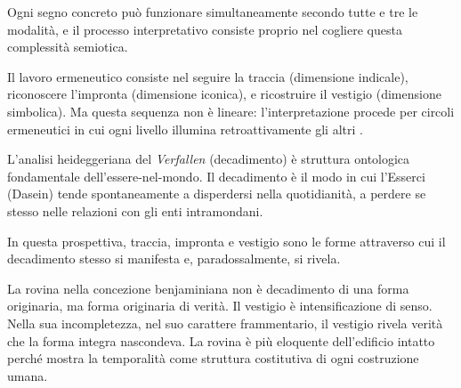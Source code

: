 \documentclass{../../lib/gs}
\begin{document}

Ogni segno concreto può funzionare simultaneamente secondo tutte e tre le modalità, e il processo interpretativo consiste proprio nel cogliere questa complessità semiotica.

Il lavoro ermeneutico consiste nel seguire la traccia (dimensione indicale), riconoscere l'impronta (dimensione iconica), e ricostruire il vestigio (dimensione simbolica). Ma questa sequenza non è lineare: l'interpretazione procede per circoli ermeneutici in cui ogni livello illumina retroattivamente gli altri \cite{gadamer1960}.

%

L'analisi heideggeriana del \textit{Verfallen} (decadimento) \cite{heidegger1927} è struttura ontologica fondamentale dell'essere-nel-mondo. Il decadimento è il modo in cui l'Esserci (Dasein) tende spontaneamente a disperdersi nella quotidianità, a perdere se stesso nelle relazioni con gli enti intramondani.

In questa prospettiva, traccia, impronta e vestigio sono le forme attraverso cui il decadimento stesso si manifesta e, paradossalmente, si rivela. %


La rovina nella concezione benjaminiana \cite{benjamin1928} non è decadimento di una forma originaria, ma forma originaria di verità. Il vestigio è intensificazione di senso. Nella sua incompletezza, nel suo carattere frammentario, il vestigio rivela verità che la forma integra nascondeva. La rovina è più eloquente dell'edificio intatto perché mostra la temporalità come struttura costitutiva di ogni costruzione umana.
\end{document}
